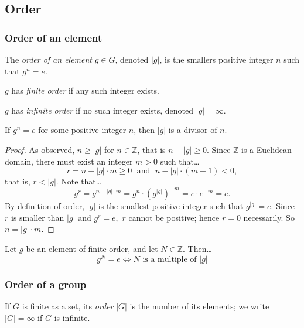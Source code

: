 \subsection{Order}

\subsubsection{Order of an element}\label{elementorder}
The \emph{order of an element} $g \in G$, denoted $|g|$, is the smallers positive integer $n$ such that $g^n = e$.

\noindent $g$ has \emph{finite order} if any such integer exists.\newline

\noindent $g$ has \emph{infinite order} if no such integer exists, denoted $|g| = \infty$.\newline

\begin{lemma}
\label{orderdividesothernums}
If $g^n = e$ for some positive integer $n$, then $|g|$ is a divisor of $n$.
\end{lemma}

\begin{proof}
As observed, $n \geq |g|$ for $n \in \mathbb{Z}$, that is $n - |g| \geq 0$. Since $\mathbb{Z}$ is a Euclidean domain, there must exist
an integer $m > 0$ such that\dots
$$r = n -|g|\cdot m \geq 0 \; \textrm{ and } \; n - |g| \cdot (m + 1) < 0,$$
that is, $r < |g|$. Note that\dots
$$g^r = g^{n - |g| \cdot m} = g^n \cdot (g^{|g|})^{-m} = e \cdot e^{-m} = e.$$
By definition of order, $|g|$ is the smallest positive integer such that $g^{|g|}=e.$ Since $r$ is smaller than $|g|$ and $g^r = e,$ $r$ cannot
be positive; hence $r = 0$ necessarily. So $n = |g| \cdot m$.
\end{proof}

\begin{corollary}
\label{orderasfirstidentityproducer}
Let $g$ be an element of finite order, and let $N \in \mathbb{Z}$. Then\dots
$$g^N = e \Leftrightarrow N \textrm{ is a multiple of } |g|$$
\end{corollary}

\subsubsection{Order of a group}\label{grouporder}
If $G$ is finite as a set, its \emph{order} $|G|$ is the number of its elements; we write $|G| = \infty$ if $G$ is infinite.

